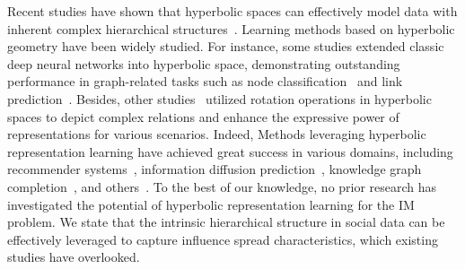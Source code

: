 Recent studies have shown that hyperbolic spaces can effectively model data with inherent complex hierarchical structures~\cite{sarkar2011low, sala2018representation, chami2020trees}.
Learning methods based on hyperbolic geometry have been widely studied.
For instance, some studies \cite{ganea2018hdnn, gulcehre2018hdnn, liu2019hdnn, chami2019hdnn} extended classic deep neural networks into hyperbolic space, demonstrating outstanding performance in graph-related tasks such as node classification~\cite{WWW2023_fu2023hyperbolic} and link prediction~\cite{AAAI2019_wang2019hyperbolic}. 
Besides, other studies~\cite{ACL20_chami2020low, feng2022role} utilized rotation operations in hyperbolic spaces to depict complex relations and enhance the expressive power of representations for various scenarios.
Indeed, Methods leveraging hyperbolic representation learning have achieved great success in various domains, including recommender systems~\cite{yang2022hicf, wang2023hdnr}, information diffusion prediction~\cite{feng2022h-diffu, CIKM23_qiao}, knowledge graph completion~\cite{ACL20_chami2020low, wang2023mixed}, and others~\cite{xu2023decoupled, song2023hisum, WWW2024_GraphHAM}.
To the best of our knowledge, no prior research has investigated the potential of hyperbolic representation learning for the IM problem. 
We state that the intrinsic hierarchical structure in social data can be effectively leveraged to capture influence spread characteristics, which existing studies have overlooked.

